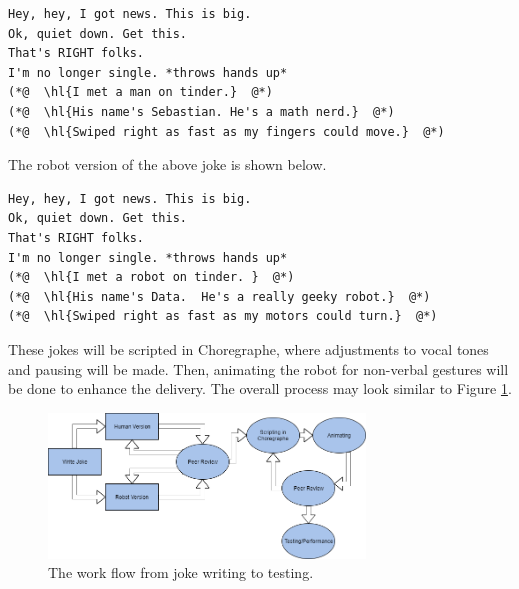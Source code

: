 \documentclass[onecolumn, draftclsnofoot,10pt, compsoc]{IEEEtran}
\begin{document}
\begin{lstlisting}
Hey, hey, I got news. This is big.
Ok, quiet down. Get this.
That's RIGHT folks.
I'm no longer single. *throws hands up*
(*@  \hl{I met a man on tinder.}  @*)
(*@  \hl{His name's Sebastian. He's a math nerd.}  @*)
(*@  \hl{Swiped right as fast as my fingers could move.}  @*)
\end{lstlisting}

The robot version of the above joke is shown below.

\begin{lstlisting}
Hey, hey, I got news. This is big.
Ok, quiet down. Get this.
That's RIGHT folks.
I'm no longer single. *throws hands up*
(*@  \hl{I met a robot on tinder. }  @*)
(*@  \hl{His name's Data.  He's a really geeky robot.}  @*)
(*@  \hl{Swiped right as fast as my motors could turn.}  @*)
\end{lstlisting}

These jokes will be scripted in Choregraphe, where adjustments to vocal tones and pausing will be made.
Then, animating the robot for non-verbal gestures will be done to enhance the delivery.
The overall process may look similar to Figure \ref{fig:write_process}.

\begin{figure}[H]
  \centering
  \includegraphics[width=0.75\textwidth,height=0.75\textheight,keepaspectratio]{joke_writing_process}
  \caption{The work flow from joke writing to testing.}
	\label{fig:write_process}
\end{figure}

\pagebreak

\pagebreak
\clearpage
\end{document}
